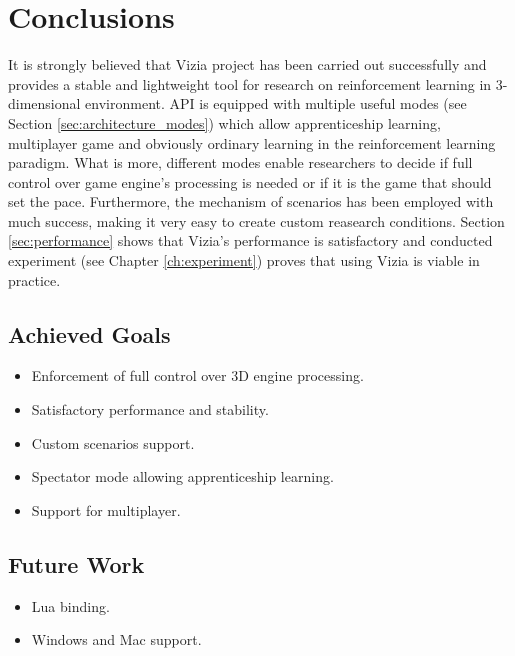 \chapter{Conclusions}\label{ch:conclusions}
	It is strongly believed that Vizia project has been carried out successfully and provides a stable and lightweight tool for research on reinforcement learning in 3-dimensional environment. API is equipped with multiple useful modes (see Section \ref{sec:architecture_modes}) which allow apprenticeship learning, multiplayer game and obviously ordinary learning in the reinforcement learning paradigm. What is more, different modes enable researchers to decide if full control over game engine's processing is needed or if it is the game that should set the pace. Furthermore, the mechanism of scenarios has been employed with much success, making it very easy to create custom reasearch conditions. Section \ref{sec:performance} shows that Vizia's performance is satisfactory and conducted experiment (see Chapter \ref{ch:experiment}) proves that using Vizia is viable in practice. 

\section{Achieved Goals}
	\begin{itemize}
		\item Enforcement of full control over 3D engine processing.
		\item Satisfactory performance and stability.
		\item Custom scenarios support.
		\item Spectator mode allowing apprenticeship learning.
		\item Support for multiplayer.
	\end{itemize}

\section{Future Work}
	\begin{itemize}
		\item Lua binding.
		\item Windows and Mac support.
	\end{itemize}